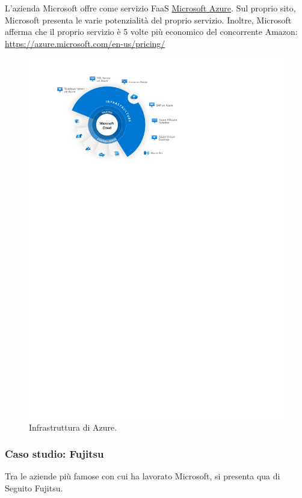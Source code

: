 \documentclass[a4paper]{article}
\begin{document}
	L'azienda Microsoft offre come servizio FaaS \href{https://azure.microsoft.com/en-us}{Microsoft Azure}. Sul proprio sito, Microsoft presenta le varie potenzialità del proprio servizio. Inoltre, Microsoft afferma che il proprio servizio è 5 volte più economico del concorrente Amazon: \url{https://azure.microsoft.com/en-us/pricing/}
	\begin{figure}[!htp]
		\centering
		\includegraphics[width=\textwidth]{img/Microsoft-1.pdf}
		\caption{Infrastruttura di Azure.}
	\end{figure}\newpage
	
	\subsubsection{Caso studio: Fujitsu}
	
	Tra le aziende più famose con cui ha lavorato Microsoft, si presenta qua di Seguito Fujitsu.\newline
	
\end{document}
